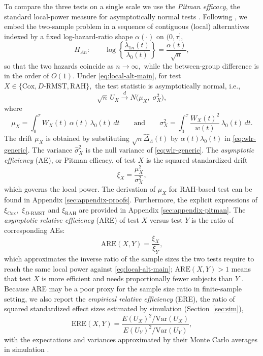 \documentclass[12pt]{article}
\newcommand{\RAH}{\mathrm{RAH}}
\newcommand{\DRMST}{D\text{-}\mathrm{RMST}}
\newcommand{\dd}{\,d}
\begin{document}
To compare the three tests on a single scale we use the
\emph{Pitman efficacy}, the standard local-power measure for asymptotically
normal tests \citep{Pitman1949}.  Following \citet{Tian2018}, we embed the
two-sample problem in a sequence of contiguous (local) alternatives indexed
by a fixed log-hazard-ratio shape $\alpha(\cdot)$ on $(0,\tau]$,
\begin{equation}\label{eq:local-alt-main}
  H_{An}:\qquad
  \log\!\left\{\frac{\lambda_{1n}(t)}{\lambda_0(t)}\right\}
    =\frac{\alpha(t)}{\sqrt{n}},
\end{equation}
so that the two hazards coincide as $n\to\infty,$ while the between-group difference is in the order of $O(1)$.  Under \eqref{eq:local-alt-main}, for
test $X\in\{\mathrm{Cox},\DRMST,\RAH\},$ the test statistic is asymptotically normal, i.e.,
\begin{equation*}
  \sqrt{n}\,U_X\xrightarrow{d}N\!\bigl(\mu_X,\;\sigma_X^2\bigr),
\end{equation*}
where
\begin{equation*}
  \mu_X=\int_0^\tau W_X(t)\,\alpha(t)\,\lambda_0(t)\dd t
  \qquad\mbox{and}\qquad
  \sigma_X^2=\int_0^\tau \frac{W_X(t)^2}{w(t)}\,\lambda_0(t)\dd t .
\end{equation*}
The drift $\mu_X$ is obtained by substituting
$\sqrt n \hat\Delta_{\Lambda}(t)$ by $\alpha(t)\lambda_0(t)$ in \eqref{eq:wlr-generic}. The variance $\hat{\sigma}_X^2$ is the null variance of
\eqref{eq:wlr-generic}.
The \emph{asymptotic efficiency} (AE), or Pitman
efficacy, of test $X$ is the squared standardized drift
\begin{equation}\label{eq:efficacy-def}
  \xi_X=\frac{\mu_X^2}{\sigma_X^2},
\end{equation}
which governs the local power. The derivation of $\mu_X$ for RAH-based test can be found in Appendix \ref{sec:appendix-proofs}. Furthermore, the
explicit expressions of
$\xi_{\mathrm{Cox}},$ $\xi_{\DRMST}$ and $\xi_{\RAH}$ are provided in Appendix \ref{sec:appendix-pitman}.
The \emph{asymptotic relative efficiency} (ARE) of test $X$ versus test $Y$
is the ratio of corresponding AEs:
\begin{equation}\label{eq:are-def}
  \mathrm{ARE}(X,Y)=\frac{\xi_X}{\xi_Y},
\end{equation}
which approximates the inverse ratio of the sample sizes the two tests
require to reach the same local power against \eqref{eq:local-alt-main};
$\mathrm{ARE}(X,Y)>1$ means that test $X$ is more efficient and needs proportionally fewer subjects than $Y$ \citep{Tian2018,Pitman1949}.  Because ARE may be a poor proxy for the sample size ratio in finite-sample setting, we also report the \emph{empirical relative efficiency} (ERE), the
ratio of squared standardized effect sizes estimated by simulation (Section~\ref{sec:sim}),
\begin{equation}\label{eq:ere-def}
  \mathrm{ERE}(X,Y)
    =\frac{E(U_X)^2/\mathrm{Var}(U_X)}
          {E(U_Y)^2/\mathrm{Var}(U_Y)},
\end{equation}
with the expectations and variances approximated by their Monte Carlo averages in simulation
\citep{Tian2018}.
\end{document}
